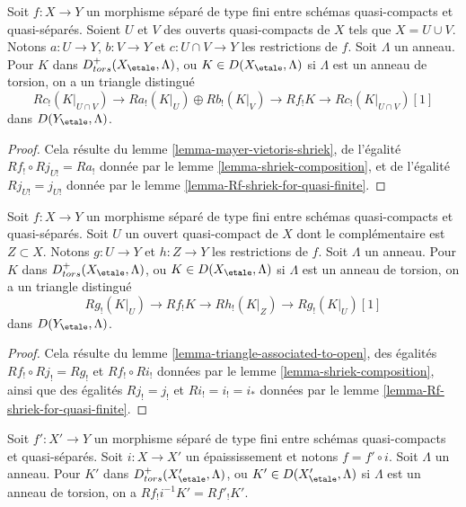 \begin{lemma}
\label{lemma-relative-mayer-vietoris}
Soit $f : X \to Y$ un morphisme séparé de type fini entre schémas quasi-compacts
et quasi-séparés. Soient $U$ et $V$ des ouverts quasi-compacts de $X$
tels que $X = U \cup V$. Notons $a : U \to Y$, $b : V \to Y$ et
$c : U \cap V \to Y$ les restrictions de $f$. Soit $\Lambda$ un anneau.
Pour $K$ dans $D^+_{tors}(X_\etale, \Lambda)$, ou $K \in D(X_\etale, \Lambda)$
si $\Lambda$ est un anneau de torsion, on a un triangle distingué
$$
Rc_!(K|_{U \cap V}) \to
Ra_!(K|_U) \oplus Rb_!(K|_V) \to
Rf_!K \to 
Rc_!(K|_{U \cap V})[1]
$$
dans $D(Y_\etale, \Lambda)$.
\end{lemma}

\begin{proof}
Cela résulte du lemme \ref{lemma-mayer-vietoris-shriek},
de l'égalité $Rf_! \circ Rj_{U!} = Ra_!$ donnée par le
lemme \ref{lemma-shriek-composition}, et de l'égalité
$Rj_{U!} = j_{U!}$ donnée par le lemme \ref{lemma-Rf-shriek-for-quasi-finite}.
\end{proof}

\begin{lemma}
\label{lemma-relative-triangle-associated-to-open}
Soit $f : X \to Y$ un morphisme séparé de type fini entre schémas quasi-compacts
et quasi-séparés. Soit $U$ un ouvert quasi-compact de $X$ dont
le complémentaire est $Z \subset X$. Notons $g : U \to Y$ et $h : Z \to Y$
les restrictions de $f$. Soit $\Lambda$ un anneau.
Pour $K$ dans $D^+_{tors}(X_\etale, \Lambda)$, ou $K \in D(X_\etale, \Lambda)$
si $\Lambda$ est un anneau de torsion, on a un triangle distingué
$$
Rg_!(K|_U) \to
Rf_!K \to
Rh_!(K|_Z) \to
Rg_!(K|_U)[1]
$$
dans $D(Y_\etale, \Lambda)$.
\end{lemma}

\begin{proof}
Cela résulte du
lemme \ref{lemma-triangle-associated-to-open},
des égalités $Rf_! \circ Rj_! = Rg_!$ et $Rf_! \circ Ri_!$ données par le
lemme \ref{lemma-shriek-composition}, ainsi que des égalités
$Rj_! = j_!$ et $Ri_! = i_! = i_*$ données par le
lemme \ref{lemma-Rf-shriek-for-quasi-finite}.
\end{proof}

\begin{lemma}
\label{lemma-shriek-and-thickening}
Soit $f' : X' \to Y$ un morphisme séparé de type fini entre schémas quasi-compacts
et quasi-séparés. Soit $i : X \to X'$ un épaississement et
notons $f = f' \circ i$. Soit $\Lambda$ un anneau.
Pour $K'$ dans $D^+_{tors}(X'_\etale, \Lambda)$, ou $K' \in D(X'_\etale, \Lambda)$
si $\Lambda$ est un anneau de torsion, on a $Rf_!i^{-1}K' = Rf'_!K'$.
\end{lemma}


